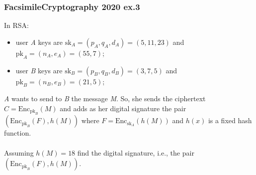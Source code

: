 \documentclass[11pt, a4paper]{article}
\begin{document}
\newpage
\subsubsection{FacsimileCryptography 2020 ex.3}
In RSA:
\begin{itemize}
    \item user \textit{A} keys are $\text{sk}_A = (p_A,q_A,d_A) = (5,11,23)$ and $\text{pk}_A = (n_A, e_A) = (55, 7)$;
    \item user \textit{B} keys are $\text{sk}_B = (p_B,q_B,d_B) = (3,7,5)$ and $\text{pk}_B = (n_B, e_B) = (21,5)$;
\end{itemize}
\textit{A} wants to send to \textit{B} the message \textit{M}. So, she sends the ciphertext $C = \text{Enc}_{\text{pk}_B}(M)$ and adds as her digital signature the pair $(\text{Enc}_{\text{pk}_B}(F),h(M))$ where $F = \text{Enc}_{\text{sk}_A}(h(M))$ and $h(x)$ is a fixed hash function.\\\\
Assuming $h(M)=18$ find the digital signature, i.e., the pair $(\text{Enc}_{\text{pk}_B}(F),h(M))$.
\end{document}
